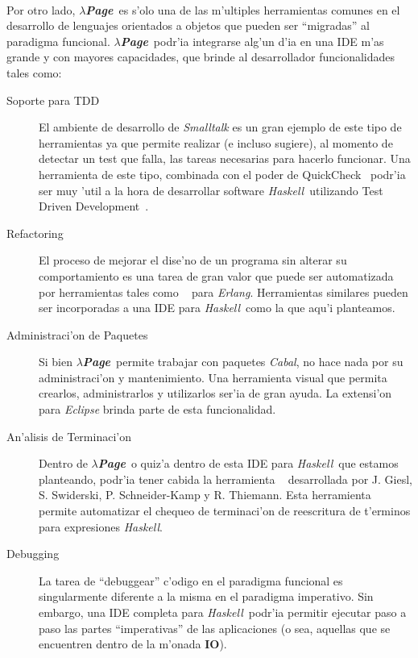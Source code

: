 \documentclass[a4paper]{article}
\newcommand{\haskell}{\textsl{Haskell}}
\newcommand{\hpage}{\textbf{\textsl{$\lambda$Page}}}
\newcommand{\cabal}{\textsl{Cabal}}
\begin{document}
\paragraph{}Por otro lado, \hpage\ es s'olo una de las m'ultiples herramientas comunes en el desarrollo de lenguajes orientados a objetos que pueden ser ``migradas'' al paradigma funcional.  \hpage\ podr'ia integrarse alg'un d'ia en una IDE m'as grande y con mayores capacidades, que brinde al desarrollador funcionalidades tales como:
\begin{description}
	\item[Soporte para TDD] El ambiente de desarrollo de \textsl{Smalltalk} es un gran ejemplo de este tipo de herramientas ya que permite realizar (e incluso sugiere), al momento de detectar un test que falla, las tareas necesarias para hacerlo funcionar.  Una herramienta de este tipo, combinada con el poder de QuickCheck~\cite{quickcheck} podr'ia ser muy 'util a la hora de desarrollar software \haskell\ utilizando Test Driven Development~\cite{tdd}.
	\item[Refactoring~\cite{refactoring}] El proceso de mejorar el dise'no de un programa sin alterar su comportamiento es una tarea de gran valor que puede ser automatizada por herramientas tales como ~\cite{wrangler} para \textsl{Erlang}.  Herramientas similares pueden ser incorporadas a una IDE para \haskell\ como la que aqu'i planteamos.
	\item[Administraci'on de Paquetes] Si bien \hpage\ permite trabajar con paquetes \cabal, no hace nada por su administraci'on y mantenimiento.  Una herramienta visual que permita crearlos, administrarlos y utilizarlos ser'ia de gran ayuda.  La extensi'on ~\cite{eclipsefp} para \textsl{Eclipse} brinda parte de esta funcionalidad.
	\item[An'alisis de Terminaci'on] Dentro de \hpage\ o quiz'a dentro de esta IDE para \haskell\ que estamos planteando, podr'ia tener cabida la herramienta ~\cite{giesl-automated} desarrollada por  J. Giesl, S. Swiderski, P. Schneider-Kamp y R. Thiemann.  Esta herramienta permite automatizar el chequeo de terminaci'on de reescritura de t'erminos para expresiones \textsl{Haskell}.
	\item[Debugging] La tarea de ``debuggear'' c'odigo en el paradigma funcional es singularmente diferente a la misma en el paradigma imperativo.  Sin embargo, una IDE completa para \haskell\ podr'ia permitir ejecutar paso a paso las partes ``imperativas'' de las aplicaciones (o sea, aquellas que se encuentren dentro de la m'onada \textbf{IO}).
\end{description}
\end{document}
